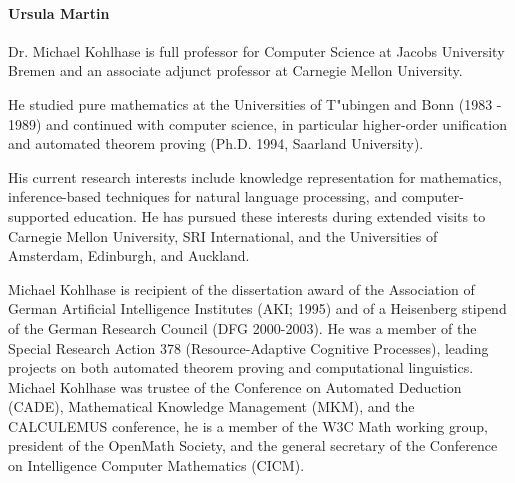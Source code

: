 \paragraph{Ursula Martin}

%

%


Dr. Michael Kohlhase is full professor for Computer Science at Jacobs University Bremen
and an associate adjunct professor at Carnegie Mellon University.

He studied pure mathematics at the Universities of T"ubingen and Bonn (1983 - 1989) and
continued with computer science, in particular higher-order unification and automated
theorem proving (Ph.D. 1994, Saarland University). 

His current research interests include knowledge representation for mathematics,
inference-based techniques for natural language processing, and computer-supported
education. He has pursued these interests during extended visits to Carnegie Mellon
University, SRI International, and the Universities of Amsterdam, Edinburgh, and Auckland.

Michael Kohlhase is recipient of the dissertation award of the Association of German
Artificial Intelligence Institutes (AKI; 1995) and of a Heisenberg stipend of the German
Research Council (DFG 2000-2003). He was a member of the Special Research Action 378
(Resource-Adaptive Cognitive Processes), leading projects on both automated theorem
proving and computational linguistics. Michael Kohlhase was trustee of the Conference on
Automated Deduction (CADE), Mathematical Knowledge Management (MKM), and the CALCULEMUS
conference, he is a member of the W3C Math working group, president of the OpenMath
Society, and the general secretary of the Conference on Intelligence Computer Mathematics
(CICM).



 


